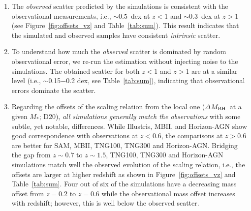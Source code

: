 \documentclass[twocolumn]{aastex631}
\def\smass{{$M_*$}}
\def\mbh{$M_{\rm BH}$}
\begin{document}
\begin{enumerate}

\item{}The {\it observed} scatter predicted by the simulations is consistent with the observational measurements, i.e., $\sim0.5$~dex at $z<1$ and $\sim0.3$~dex at $z>1$ (see Figure~\ref{fig:offsets_vz} and Table~\ref{tab:sum}). This result indicates that the simulated and observed samples have consistent {\it intrinsic} scatter.

\item{}To understand how much the {\it observed} scatter is dominated by random observational error,
we re-run the estimation without injecting noise to the simulations. The obtained scatter for both $z<1$ and $z>1$ are at a similar level (i.e.,  $\sim$0.15$-$0.2 dex, see Table~\ref{tab:sum}), indicating that observational errors dominate the scatter.

\item{} Regarding the offsets of the scaling relation from the local one ($\Delta$\mbh\ at a given \smass; D20), {\it all simulations generally match the observations} with some subtle, yet notable, differences. While Illustris, MBII, and Horizon-AGN show good correspondence with observations at $z<0.6$, the comparisons at $z>0.6$ are better for SAM, MBII, TNG100, TNG300 and Horizon-AGN. Bridging the gap from \hbox{$z\sim0.7$} to $z\sim1.5$, TNG100, TNG300 and Horizon-AGN simulations match well the observed evolution of the scaling relation, i.e., the offsets are larger at higher redshift as shown in Figure~\ref{fig:offsets_vz} and Table~\ref{tab:sum}. Four out of six of the simulations have a decreasing mass offset from $z=0.2$ to $z=0.6$ while the observational mass offset increases with redshift; however, this is well below the observed scatter.
\end{enumerate}
\end{document}
